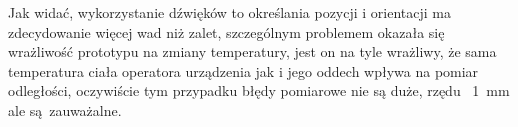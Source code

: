 Jak widać, wykorzystanie dźwięków to określania pozycji i orientacji ma zdecydowanie więcej wad niż zalet,
szczególnym problemem okazała się wrażliwość prototypu na zmiany temperatury, jest on na tyle wrażliwy, że 
sama temperatura ciała operatora urządzenia jak i jego oddech wpływa na pomiar odległości, oczywiście tym przypadku błędy pomiarowe
nie są duże, rzędu ~\SI{1}{mm} ale są zauważalne.
